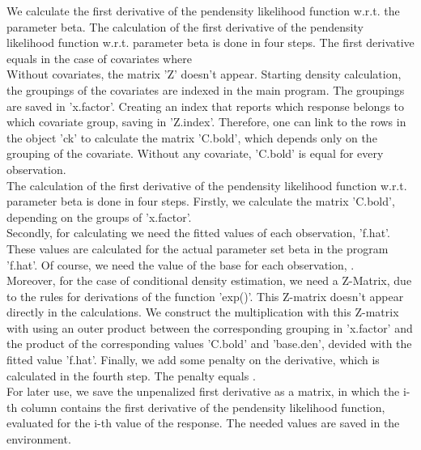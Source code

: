 \begin{Details}\relax
We calculate the first derivative of the pendensity likelihood function w.r.t. the parameter beta. The calculation of the first derivative of the pendensity likelihood function w.r.t. parameter beta is done in four steps. The first derivative equals in the case of covariates
where
\\
Without covariates, the matrix 'Z' doesn't appear. Starting density calculation, the groupings of the covariates are indexed in the main program. The groupings are saved in 'x.factor'. Creating an index that reports which response belongs to which covariate group, saving in 'Z.index'. Therefore, one can link to the rows in the object 'ck' to calculate the matrix 'C.bold', which depends only on the grouping of the covariate. Without any covariate, 'C.bold' is equal for every observation.\\
The calculation of the first derivative of the pendensity likelihood function w.r.t. parameter beta is done in four steps. Firstly, we calculate the matrix 'C.bold', depending on the groups of 'x.factor'.\\
Secondly, for calculating we need the fitted values of each observation, 'f.hat'. These values are calculated for the actual parameter set beta in the program 'f.hat'. Of course, we need the value of the base for each observation, \eqn{\phi[i]}{}.\\
Moreover, for the case of conditional density estimation, we need a Z-Matrix, due to the rules for derivations of the function 'exp()'. This Z-matrix doesn't appear directly in the calculations. We construct the multiplication with this Z-matrix with using an outer product between the corresponding grouping in 'x.factor' and the product of the corresponding values 'C.bold' and 'base.den', devided with the fitted value 'f.hat'. Finally, we add some penalty on the derivative, which is calculated in the fourth step. The penalty equals {}.\\
For later use, we save the unpenalized first derivative as a matrix, in which the i-th column contains the first derivative of the pendensity likelihood function, evaluated for the i-th value of the response. The needed values are saved in the environment.
\end{Details}
